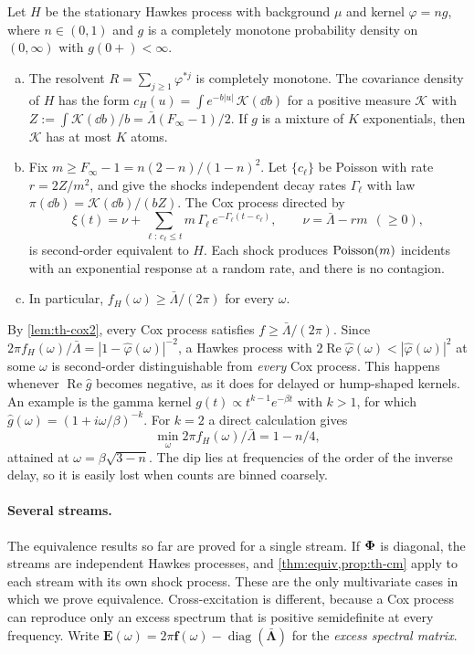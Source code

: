 \begin{proposition}\label{prop:th-cm}
Let $H$ be the stationary Hawkes process with background $\mu$ and kernel
$\varphi=ng$, where $n\in(0,1)$ and $g$ is a completely monotone probability density
on $(0,\infty)$ with $g(0+)<\infty$.
\begin{enumerate}[(a)]
  \item The resolvent $R=\sum_{j\ge1}\varphi^{*j}$ is completely monotone. The
  covariance density of $H$ has the form $c_H(u)=\int e^{-b|u|}\,\mathcal K(\dd b)$ for a
  positive measure $\mathcal K$ with $Z:=\int \mathcal K(\dd b)/b=\bar\Lambda(F_\infty-1)/2$. If $g$ is a
  mixture of $K$ exponentials, then $\mathcal K$ has at most $K$ atoms.
  \item Fix $m\ge F_\infty-1=n(2-n)/(1-n)^2$. Let $\{c_\ell\}$ be Poisson with rate
  $r=2Z/m^2$, and give the shocks independent decay rates $\Gamma_\ell$ with law
  $\pi(\dd b)=\mathcal K(\dd b)/(bZ)$. The Cox process directed by
  \[
  \xi(t)=\nu+\sum_{\ell:\,c_\ell\le t}m\,\Gamma_\ell\,e^{-\Gamma_\ell(t-c_\ell)},
  \qquad \nu=\bar\Lambda-r m\ \ (\ge0),
  \]
  is second-order equivalent to $H$. Each shock produces $\operatorname{Poisson}(m)$ incidents with an
  exponential response at a random rate, and there is no contagion.
  \item In particular, $f_H(\omega)\ge\bar\Lambda/(2\pi)$ for every $\omega$.
\end{enumerate}
\end{proposition}

\begin{remark}\label{rem:th-noncm}
By \cref{lem:th-cox2}, every Cox process satisfies $f\ge\bar\Lambda/(2\pi)$. Since
$2\pi f_H(\omega)/\bar\Lambda=|1-\hat\varphi(\omega)|^{-2}$, a Hawkes process with
$2\operatorname{Re}\hat\varphi(\omega)<|\hat\varphi(\omega)|^2$ at some $\omega$ is
second-order distinguishable from \emph{every} Cox process. This happens whenever
$\operatorname{Re}\hat g$ becomes negative, as it does for delayed or hump-shaped
kernels. An example is the gamma kernel $g(t)\propto t^{k-1}e^{-\beta t}$ with $k>1$,
for which $\hat g(\omega)=(1+i\omega/\beta)^{-k}$. For $k=2$ a direct calculation gives
\[
\min_\omega 2\pi f_H(\omega)/\bar\Lambda=1-n/4,
\]
attained at $\omega=\beta\sqrt{3-n}$. The dip lies at frequencies of the order of the
inverse delay, so it is easily lost when counts are binned coarsely.
\end{remark}

\paragraph{Several streams.} The equivalence results so far are proved for a single stream.
If $\bm{\Phi}$ is diagonal, the streams are independent Hawkes processes, and
\cref{thm:equiv,prop:th-cm} apply to each stream with its own shock process. These are the
only multivariate cases in which we prove equivalence. Cross-excitation is different,
because a Cox process can reproduce only an excess spectrum that is positive semidefinite
at every frequency. Write $\bm E(\omega)=2\pi\bm f(\omega)-\operatorname{diag}(\bar{\bm\Lambda})$
for the \emph{excess spectral matrix}.

